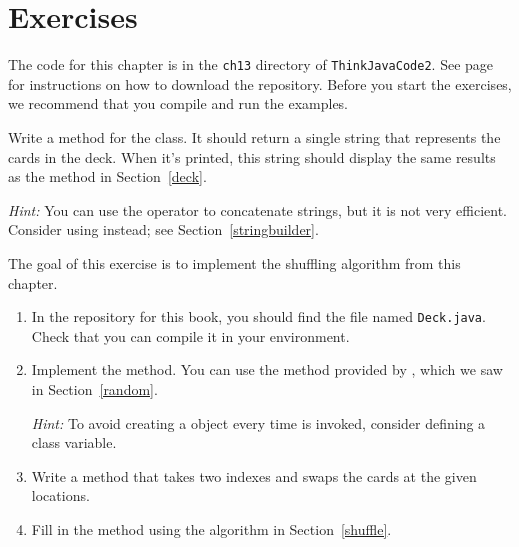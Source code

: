 \section{Exercises}

The code for this chapter is in the {\tt ch13} directory of {\tt ThinkJavaCode2}.
See page~\pageref{code} for instructions on how to download the repository.
Before you start the exercises, we recommend that you compile and run the examples.


\begin{exercise}  %

Write a  method for the  class.
It should return a single string that represents the cards in the deck.
When it's printed, this string should display the same results as the  method in Section~\ref{deck}.


{\it Hint:} You can use the \java{+} operator to concatenate strings, but it is not very efficient.
Consider using  instead; see Section~\ref{stringbuilder}.

\end{exercise}


\begin{exercise}  %
\label{ex.shuffle}

The goal of this exercise is to implement the shuffling algorithm from this chapter.

\begin{enumerate}


\item In the repository for this book, you should find the file named {\tt Deck.java}.
Check that you can compile it in your environment.

\item Implement the  method.
You can use the  method provided by , which we saw in Section~\ref{random}.

{\it Hint:} To avoid creating a  object every time  is invoked, consider defining a class variable.

\item Write a  method that takes two indexes and swaps the cards at the given locations.

\item Fill in the  method using the algorithm in Section~\ref{shuffle}.

\end{enumerate}

\end{exercise}


